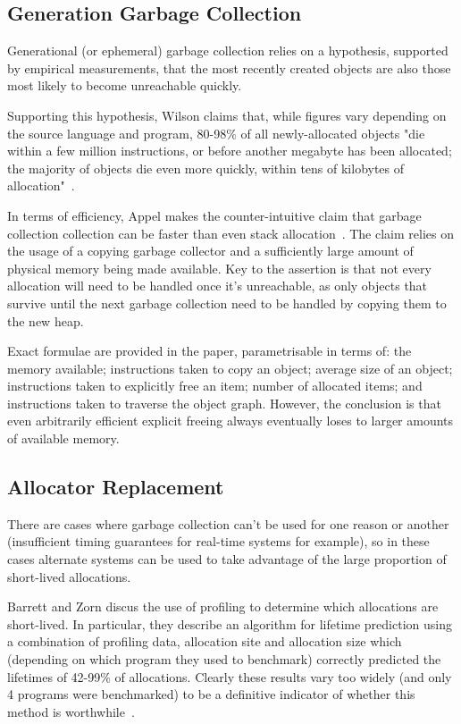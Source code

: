 \subsection{Generation Garbage Collection}

Generational (or ephemeral) garbage collection relies on a hypothesis, supported by empirical measurements, that the most recently created objects are also those most likely to become unreachable quickly.

Supporting this hypothesis, Wilson claims that, while figures vary depending on the source language and program, 80-98\% of all newly-allocated objects "die within a few million instructions, or before another megabyte has been allocated; the majority of objects die even more quickly, within tens of kilobytes of allocation"~\cite{uniprocessorgc}.

In terms of efficiency, Appel makes the counter-intuitive claim that garbage collection collection can be faster than even stack allocation~\cite{stackvgc}. The claim relies on the usage of a copying garbage collector and a sufficiently large amount of physical memory being made available. Key to the assertion is that not every allocation will need to be handled once it's unreachable, as only objects that survive until the next garbage collection need to be handled by copying them to the new heap.

Exact formulae are provided in the paper, parametrisable in terms of: the memory available; instructions taken to copy an object; average size of an object; instructions taken to explicitly free an item; number of allocated items; and instructions taken to traverse the object graph. However, the conclusion is that even arbitrarily efficient explicit freeing always eventually loses to larger amounts of available memory.

\subsection{Allocator Replacement}

There are cases where garbage collection can't be used for one reason or another (insufficient timing guarantees for real-time systems for example), so in these cases alternate systems can be used to take advantage of the large proportion of short-lived allocations.

Barrett and Zorn discus the use of profiling to determine which allocations are short-lived. In particular, they describe an algorithm for lifetime prediction using a combination of profiling data, allocation site and allocation size which (depending on which program they used to benchmark) correctly predicted the lifetimes of 42-99\% of allocations. Clearly these results vary too widely (and only 4 programs were benchmarked) to be a definitive indicator of whether this method is worthwhile~\cite{predictors}.

